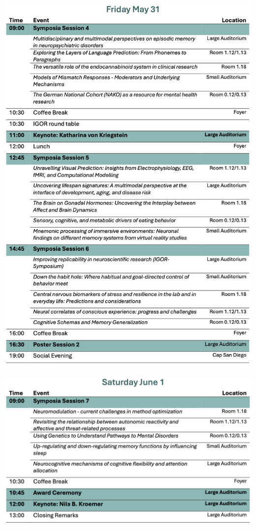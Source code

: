     \begin{center}
		\includegraphics[width=1\textwidth]{tex/images/programme_overview/Fri.png}
	\end{center}
		
	\newpage

    \begin{center}
		\includegraphics[width=1\textwidth]{tex/images/programme_overview/Sat.png}
	\end{center}
		
	\newpage